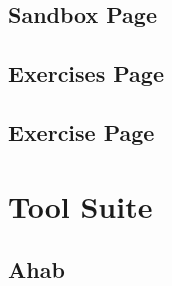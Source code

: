 \subsection{Sandbox Page}

\subsection{Exercises Page}

\subsection{Exercise Page}

\section{Tool Suite}

\subsection{Ahab}

\pagebreak
